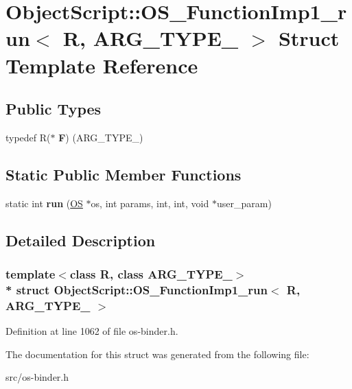 \hypertarget{struct_object_script_1_1_o_s___function_imp1__run}{}\section{Object\+Script\+:\+:O\+S\+\_\+\+Function\+Imp1\+\_\+run$<$ R, A\+R\+G\+\_\+\+T\+Y\+P\+E\+\_ $>$ Struct Template Reference}
\label{struct_object_script_1_1_o_s___function_imp1__run}
\subsection*{Public Types}
\begin{DoxyCompactItemize}
\item 
typedef R($\ast$ {\bfseries F}) (A\+R\+G\+\_\+\+T\+Y\+P\+E\+\_)\hypertarget{struct_object_script_1_1_o_s___function_imp1__run_a23afcd76071216b94858187e8a05d512}{}\label{struct_object_script_1_1_o_s___function_imp1__run_a23afcd76071216b94858187e8a05d512}

\end{DoxyCompactItemize}
\subsection*{Static Public Member Functions}
\begin{DoxyCompactItemize}
\item 
static int {\bfseries run} (\hyperlink{class_object_script_1_1_o_s}{OS} $\ast$os, int params, int, int, void $\ast$user\+\_\+param)\hypertarget{struct_object_script_1_1_o_s___function_imp1__run_a07445f001b5288675060624ae1a41149}{}\label{struct_object_script_1_1_o_s___function_imp1__run_a07445f001b5288675060624ae1a41149}

\end{DoxyCompactItemize}


\subsection{Detailed Description}
\subsubsection*{template$<$class R, class A\+R\+G\+\_\+\+T\+Y\+P\+E\+\_$>$\\*
struct Object\+Script\+::\+O\+S\+\_\+\+Function\+Imp1\+\_\+run$<$ R, A\+R\+G\+\_\+\+T\+Y\+P\+E\+\_ $>$}



Definition at line 1062 of file os-\/binder.\+h.



The documentation for this struct was generated from the following file\+:\begin{DoxyCompactItemize}
\item 
src/os-\/binder.\+h\end{DoxyCompactItemize}

